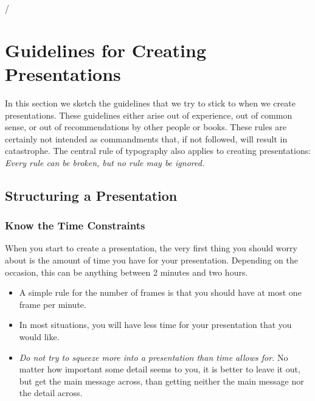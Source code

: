 /%
%
%
%


\section{Guidelines for Creating Presentations}
\label{section-guidelines}

In this section we sketch the guidelines that we try to stick to when we create presentations. These guidelines either arise out of experience, out of common sense, or out of recommendations by other people or books. These rules are certainly not intended as commandments that, if not followed, will result in catastrophe. The central rule of typography also applies to creating presentations: \emph{Every rule can be broken, but no rule may be ignored.}


\subsection{Structuring a Presentation}
\label{section-structure-guidelines}

\subsubsection{Know the Time Constraints}

When you start to create a presentation, the very first thing you should worry about is the amount of time you have for your presentation. Depending on the occasion, this can be anything between 2 minutes and two hours.
\begin{itemize}
\item
  A simple rule for the number of frames is that you should have at most one frame per minute.
\item
  In most situations, you will have less time for your presentation that you would like.
\item
  \emph{Do not try to squeeze more into a presentation than time allows for.} No matter how important some detail seems to you, it is better to leave it out, but get the main message across, than getting neither the main message nor the detail across.
\end{itemize}

